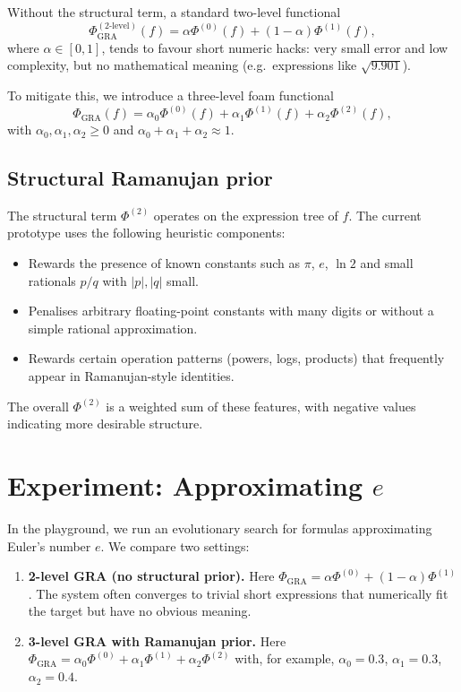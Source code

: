 \documentclass[11pt]{article}
\begin{document}
Without the structural term, a standard two-level functional
\[
  \Phi_{\mathrm{GRA}}^{(2\text{-level})}(f)
  = \alpha \Phi^{(0)}(f) + (1-\alpha)\Phi^{(1)}(f),
\]
where $\alpha \in [0,1]$, tends to favour short numeric hacks: very small error and low complexity, but no mathematical meaning (e.g.\ expressions like $\sqrt{9.901}$).

To mitigate this, we introduce a three-level foam functional
\[
  \Phi_{\mathrm{GRA}}(f)
  = \alpha_0 \Phi^{(0)}(f)
  + \alpha_1 \Phi^{(1)}(f)
  + \alpha_2 \Phi^{(2)}(f),
\]
with $\alpha_0,\alpha_1,\alpha_2 \ge 0$ and $\alpha_0+\alpha_1+\alpha_2 \approx 1$.

\subsection{Structural Ramanujan prior}

The structural term $\Phi^{(2)}$ operates on the expression tree of $f$.
The current prototype uses the following heuristic components:
\begin{itemize}
  \item Rewards the presence of known constants such as $\pi$, $e$, $\ln 2$ and small rationals $p/q$ with $|p|,|q|$ small.
  \item Penalises arbitrary floating-point constants with many digits or without a simple rational approximation.
  \item Rewards certain operation patterns (powers, logs, products) that frequently appear in Ramanujan-style identities.
\end{itemize}
The overall $\Phi^{(2)}$ is a weighted sum of these features, with negative values indicating more desirable structure.

\section{Experiment: Approximating $e$}

In the playground, we run an evolutionary search for formulas approximating Euler's number $e$.
We compare two settings:

\begin{enumerate}
  \item \textbf{2-level GRA (no structural prior).}
  Here $\Phi_{\mathrm{GRA}} = \alpha \Phi^{(0)} + (1-\alpha)\Phi^{(1)}$.
  The system often converges to trivial short expressions that numerically fit the target but have no obvious meaning.

  \item \textbf{3-level GRA with Ramanujan prior.}
  Here $\Phi_{\mathrm{GRA}} = \alpha_0 \Phi^{(0)} + \alpha_1 \Phi^{(1)} + \alpha_2 \Phi^{(2)}$ with, for example,
  $\alpha_0 = 0.3$, $\alpha_1 = 0.3$, $\alpha_2 = 0.4$.
\end{enumerate}
\end{document}
